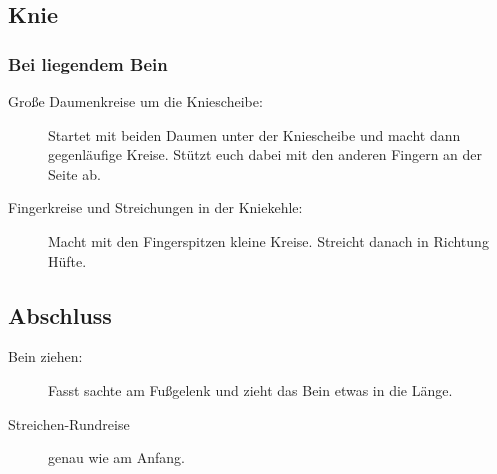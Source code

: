 \subsection{Knie}

\subsubsection{Bei liegendem Bein}

\begin{description}
  \item [Große Daumenkreise um die Kniescheibe:] Startet mit beiden Daumen unter der Kniescheibe und macht dann gegenläufige Kreise. Stützt euch dabei mit den anderen Fingern an der Seite ab.
  \item [Fingerkreise und Streichungen in der Kniekehle:] Macht mit den Fingerspitzen kleine Kreise. Streicht danach in Richtung Hüfte.
\end{description}


\subsection{Abschluss}

\begin{description}
  \item [Bein ziehen:] Fasst sachte am Fußgelenk und zieht das Bein etwas in die Länge.
  \item [Streichen-Rundreise] genau wie am Anfang.
\end{description}

